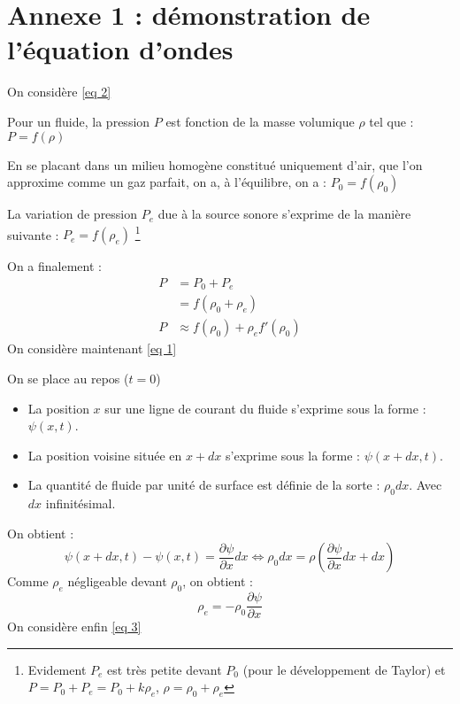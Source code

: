 \chapter*{Annexe 1 : démonstration de l'équation d'ondes}
\label{Annexe 1}
On considère \eqref{eq 2} \newline

Pour un fluide, la pression $P$ est fonction de la masse volumique $\rho$ tel que : $P = f(\rho)$ \newline

En se placant dans un milieu homogène constitué uniquement d'air, que l'on approxime comme un gaz parfait, on a, à l'équilibre, on a : $P_{0} = f(\rho_{0})$ \newline

La variation de pression $P_{e}$ due à la source sonore s'exprime de la manière suivante : $P_{e} =  f(\rho_{e})$ 
\footnote{Evidement $P_{e}$ est très petite devant $P_{0}$ (pour le développement de Taylor) et $P = P_{0} + P_{e} = P_{0} + k\rho_{e}$, $\rho = \rho_{0} + \rho_{e}$} \newline

On a finalement : 
\begin{align}
    P &= P_{0} +  P_{e} \nonumber \\
        &= f(\rho_{0} + \rho_{e}) \nonumber \\
    P   &\approx f(\rho_{0}) + \rho_{e}f'(\rho_{0}) \nonumber
\end{align}
On considère maintenant \eqref{eq 1} \newline

On se place au repos ($t=0$) \newline

\begin{itemize}
    \item La position $x$ sur une ligne de courant du fluide s'exprime sous la forme : $\psi (x,t)$. \newline
    \item La position voisine située en $x + dx$ s'exprime sous la forme : $\psi(x + dx,t)$. \newline
    \item La quantité de fluide par unité de surface est définie de la sorte : $\rho_{0}dx$. Avec $dx$ infinitésimal.
\end{itemize}
On obtient : 
\begin{equation}
    \psi(x + dx,t) - \psi(x,t) = \frac{\partial \psi}{\partial x}dx \Longleftrightarrow \rho_{0}dx = \rho(\frac{\partial \psi}{\partial x}dx + dx) \nonumber
\end{equation}
Comme $\rho_{e}$ négligeable devant $\rho_{0}$, on obtient : 
\begin{equation}
    \rho_{e} = - \rho_{0}\frac{\partial \psi}{\partial x} \nonumber
\end{equation}
\newpage
On considère enfin \eqref{eq 3} \newline

